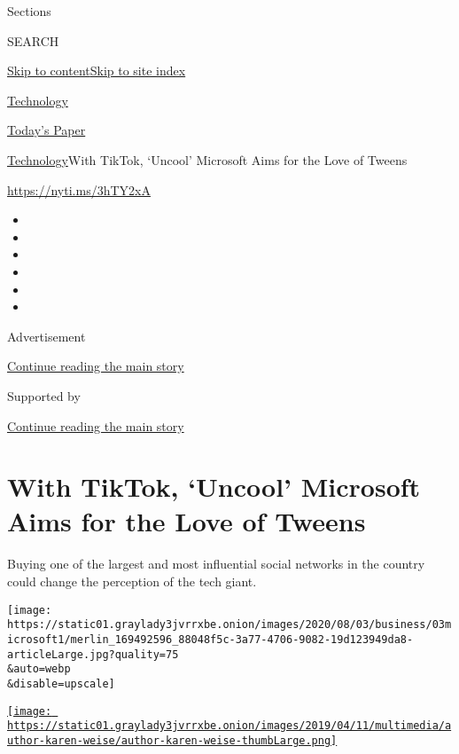Sections

SEARCH

\protect\hyperlink{site-content}{Skip to
content}\protect\hyperlink{site-index}{Skip to site index}

\href{https://www.nytimes3xbfgragh.onion/section/technology}{Technology}

\href{https://myaccount.nytimes3xbfgragh.onion/auth/login?response_type=cookie\&client_id=vi}{}

\href{https://www.nytimes3xbfgragh.onion/section/todayspaper}{Today's
Paper}

\href{/section/technology}{Technology}\textbar{}With TikTok, `Uncool'
Microsoft Aims for the Love of Tweens

\href{https://nyti.ms/3hTY2xA}{https://nyti.ms/3hTY2xA}

\begin{itemize}
\item
\item
\item
\item
\item
\item
\end{itemize}

Advertisement

\protect\hyperlink{after-top}{Continue reading the main story}

Supported by

\protect\hyperlink{after-sponsor}{Continue reading the main story}

\hypertarget{with-tiktok-uncool-microsoft-aims-for-the-love-of-tweens}{%
\section{With TikTok, `Uncool' Microsoft Aims for the Love of
Tweens}\label{with-tiktok-uncool-microsoft-aims-for-the-love-of-tweens}}

Buying one of the largest and most influential social networks in the
country could change the perception of the tech giant.

\texttt{[image: https://static01.graylady3jvrrxbe.onion/images/2020/08/03/business/03microsoft1/merlin\_169492596\_88048f5c-3a77-4706-9082-19d123949da8-articleLarge.jpg?quality=75\\\&auto=webp\\\&disable=upscale]}

\href{https://www.nytimes3xbfgragh.onion/by/karen-weise}{\texttt{[image: https://static01.graylady3jvrrxbe.onion/images/2019/04/11/multimedia/author-karen-weise/author-karen-weise-thumbLarge.png]}}

